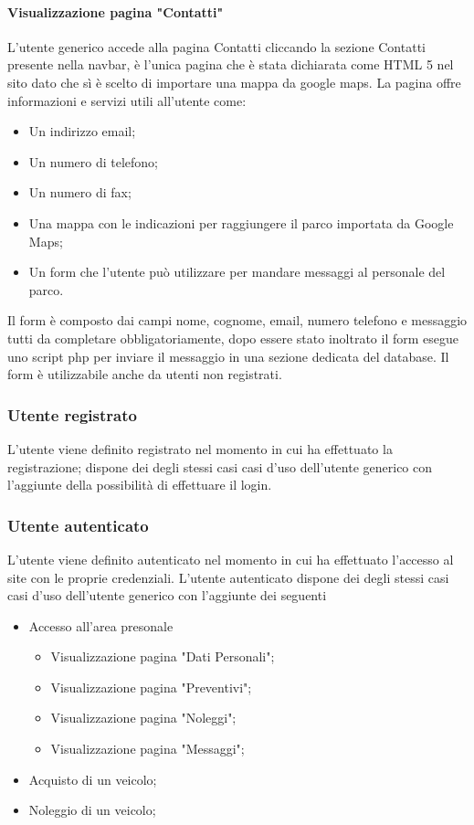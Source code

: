         \paragraph{Visualizzazione pagina "Contatti"}
        L’utente generico accede alla pagina Contatti cliccando la sezione Contatti presente nella navbar, è l'unica pagina che è stata dichiarata come HTML 5 nel sito dato che sì è scelto di importare una mappa da google maps. La pagina offre informazioni e servizi utili all’utente come:
        \begin{itemize}
            \item Un indirizzo email;
            \item Un numero di telefono;
            \item Un numero di fax;
            \item Una mappa con le indicazioni per raggiungere il parco importata da Google Maps;
            \item Un form che l’utente può utilizzare per mandare messaggi al personale del parco.
        \end{itemize}
        Il form è composto dai campi nome, cognome, email, numero telefono e messaggio tutti da completare obbligatoriamente, dopo essere stato inoltrato il form esegue uno script php per inviare il messaggio in una sezione dedicata del database. Il form è utilizzabile anche da utenti non registrati.

        \subsubsection{Utente registrato}
        L’utente viene definito registrato nel momento in cui ha effettuato la registrazione; dispone dei degli stessi casi casi d’uso dell'utente generico con l'aggiunte della possibilità di effettuare il login.

        \subsubsection{Utente autenticato}
        L’utente viene definito autenticato nel momento in cui ha effettuato l'accesso al site con le proprie credenziali.
        L’utente autenticato dispone dei degli stessi casi casi d’uso dell'utente generico con l'aggiunte dei seguenti
        \begin{itemize}
            \item Accesso all'area presonale
            \begin{itemize}
                \item Visualizzazione pagina "Dati Personali";
                \item Visualizzazione pagina "Preventivi";
                \item Visualizzazione pagina "Noleggi";
                \item Visualizzazione pagina "Messaggi";
            \end{itemize}
            \item Acquisto di un veicolo;
            \item Noleggio di un veicolo;
        \end{itemize}

